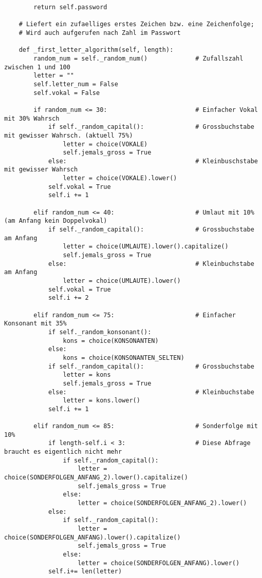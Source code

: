 \documentclass[a4paper,10pt,ngerman]{scrartcl}
\begin{document}
\begin{lstlisting}
        return self.password

    # Liefert ein zufaelliges erstes Zeichen bzw. eine Zeichenfolge;
    # Wird auch aufgerufen nach Zahl im Passwort
    
    def _first_letter_algorithm(self, length):
        random_num = self._random_num()             # Zufallszahl zwischen 1 und 100
        letter = ""
        self.letter_num = False
        self.vokal = False

        if random_num <= 30:                        # Einfacher Vokal mit 30% Wahrsch
            if self._random_capital():              # Grossbuchstabe mit gewisser Wahrsch. (aktuell 75%)
                letter = choice(VOKALE)
                self.jemals_gross = True
            else:                                   # Kleinbuschstabe mit gewisser Wahrsch
                letter = choice(VOKALE).lower()
            self.vokal = True
            self.i += 1

        elif random_num <= 40:                      # Umlaut mit 10% (am Anfang kein Doppelvokal)
            if self._random_capital():              # Grossbuchstabe am Anfang
                letter = choice(UMLAUTE).lower().capitalize()
                self.jemals_gross = True
            else:                                   # Kleinbuchstabe am Anfang
                letter = choice(UMLAUTE).lower()
            self.vokal = True
            self.i += 2

        elif random_num <= 75:                      # Einfacher Konsonant mit 35%
            if self._random_konsonant():
                kons = choice(KONSONANTEN)
            else:
                kons = choice(KONSONANTEN_SELTEN)
            if self._random_capital():              # Grossbuchstabe
                letter = kons
                self.jemals_gross = True
            else:                                   # Kleinbuchstabe
                letter = kons.lower()
            self.i += 1

        elif random_num <= 85:                      # Sonderfolge mit 10%
            if length-self.i < 3:                   # Diese Abfrage braucht es eigentlich nicht mehr
                if self._random_capital():
                    letter = choice(SONDERFOLGEN_ANFANG_2).lower().capitalize()
                    self.jemals_gross = True
                else:
                    letter = choice(SONDERFOLGEN_ANFANG_2).lower()
            else:
                if self._random_capital():
                    letter = choice(SONDERFOLGEN_ANFANG).lower().capitalize()
                    self.jemals_gross = True
                else:
                    letter = choice(SONDERFOLGEN_ANFANG).lower()
            self.i+= len(letter)


\end{lstlisting}
\end{document}
